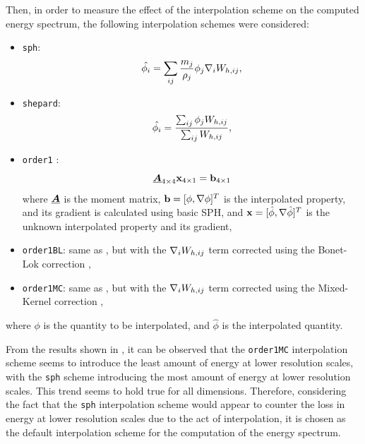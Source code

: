 Then, in order to measure the effect of the interpolation scheme on the computed energy spectrum, the following interpolation schemes were considered:
\begin{itemize}
    \item \texttt{sph}:
    \begin{equation}
        \hat{\phi_i} = \sum_{ij} \frac{m_j}{\rho_j} \phi_j \nabla_{i} W_{h, ij},
    \end{equation}
    
    \item \texttt{shepard}:
    \begin{equation}
        \hat{\phi_i} = \frac{\sum_{ij} \phi_j W_{h, ij}}{\sum_{ij} W_{h, ij}},
    \end{equation}

    \item \texttt{order1} \parencite{Liu2006}:
    \begin{equation}
      \underline{\bm{A}}_{4 \times 4} \mathbf{x}_{4 \times 1} = \mathbf{b}_{4 \times 1}
      \label{eq:interp-order1}
    \end{equation}
    where $\underline{\bm{A}}$ is the moment matrix, $\mathbf{b} = [\phi, \nabla \phi]^T$ is the interpolated property, and its gradient is calculated using basic SPH, and $\mathbf{x} = [\hat{\phi}, \nabla \hat{\phi}]^T$ is the unknown interpolated property and its gradient,

    \item \texttt{order1BL}: same as , but with the $\nabla_{i} W_{h, ij}$ term corrected using the Bonet-Lok correction \parencite{bonet1999variational},

    \item \texttt{order1MC}: same as , but with the $\nabla_{i} W_{h, ij}$ term corrected using the Mixed-Kernel correction \parencite{bonet1999variational},
\end{itemize}
where $\phi$ is the quantity to be interpolated, and $\hat{\phi}$ is the interpolated quantity.

From the results shown in , it can be observed that the \texttt{order1MC} interpolation scheme seems to introduce the least amount of energy at lower resolution scales, with the \texttt{sph} scheme introducing the most amount of energy at lower resolution scales. This trend seems to hold true for all dimensions.
Therefore, considering the fact that the \texttt{sph} interpolation scheme would appear to counter the loss in energy at lower resolution scales due to the act of interpolation, it is chosen as the default interpolation scheme for the computation of the energy spectrum.

